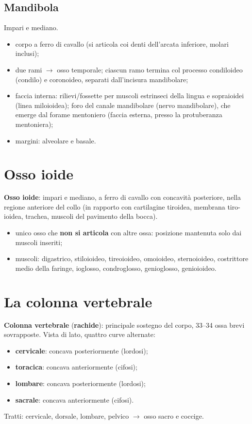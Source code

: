 \subsection{Mandibola}
Impari e mediano.
\begin{itemize}
  \item corpo a ferro di cavallo (si articola coi denti dell'arcata inferiore, molari inclusi);
  \item due rami $\rightarrow$ osso temporale; ciascun ramo termina col processo condiloideo
    (condilo) e coronoideo, separati dall'incisura mandibolare;
  \item faccia interna: rilievi/fossette per muscoli estrinseci della lingua e sopraioidei (linea
    miloioidea); foro del canale mandibolare (nervo mandibolare), che emerge dal forame mentoniero
    (faccia esterna, presso la protuberanza mentoniera);
  \item margini: alveolare e basale.
\end{itemize}

\section{Osso ioide}

\textbf{Osso ioide}: impari e mediano, a ferro di cavallo con concavità posteriore, nella regione
anteriore del collo (in rapporto con cartilagine tiroidea, membrana tiro-ioidea, trachea, muscoli
del pavimento della bocca).
\begin{itemize}
  \item unico osso che \textbf{non si articola} con altre ossa: posizione mantenuta solo dai
    muscoli inseriti;
  \item muscoli: digastrico, stiloioideo, tireoioideo, omoioideo, sternoioideo, costrittore medio
    della faringe, ioglosso, condroglosso, genioglosso, genioioideo.
\end{itemize}

\section{La colonna vertebrale}

\textbf{Colonna vertebrale} (\textbf{rachide}): principale sostegno del corpo, 33--34 ossa brevi
sovrapposte. Vista di lato, quattro curve alternate:
\begin{itemize}
  \item \textbf{cervicale}: concava posteriormente (lordosi);
  \item \textbf{toracica}: concava anteriormente (cifosi);
  \item \textbf{lombare}: concava posteriormente (lordosi);
  \item \textbf{sacrale}: concava anteriormente (cifosi).
\end{itemize}
Tratti: cervicale, dorsale, lombare, pelvico $\rightarrow$ osso sacro e coccige.

